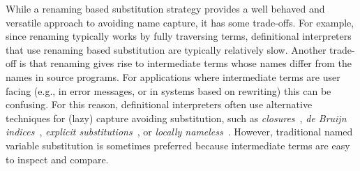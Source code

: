 While a renaming based substitution strategy provides a well behaved and versatile approach to avoiding name capture, it has some trade-offs.
For example, since renaming typically works by fully traversing terms, definitional interpreters that use renaming based substitution are typically relatively slow.
Another trade-off is that renaming gives rise to intermediate terms whose names differ from the names in source programs.
For applications where intermediate terms are user facing (e.g., in error messages, or in systems based on rewriting) this can be confusing.
For this reason, definitional interpreters often use alternative techniques for (lazy) capture avoiding substitution, such as \emph{closures}~\cite{Landin64}, \emph{de Bruijn indices}~\cite{de_Bruijn_1972}, \emph{explicit substitutions}~\cite{AbadiCCL91}, or \emph{locally nameless}~\cite{Chargueraud12}.
However, traditional named variable substitution is sometimes preferred because intermediate terms are easy to inspect and compare.

